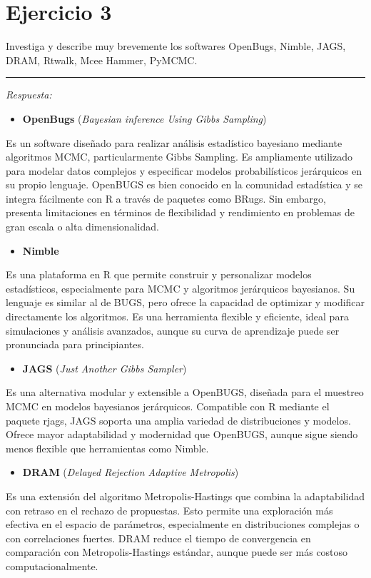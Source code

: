\newpage
\section{Ejercicio 3}
	Investiga y describe muy brevemente los softwares OpenBugs, Nimble, JAGS, DRAM, Rtwalk, Mcee Hammer, PyMCMC.

\vspace{5mm}
{\color{gray} \hrule}
\textcolor{BrickRed}{\it Respuesta:}

\begin{itemize}
	\item \textbf{OpenBugs} (\textit{Bayesian inference Using Gibbs Sampling}) 
\end{itemize}
Es un software diseñado para realizar análisis estadístico bayesiano mediante algoritmos MCMC, particularmente Gibbs Sampling. Es ampliamente utilizado para modelar datos complejos y especificar modelos probabilísticos jerárquicos en su propio lenguaje. OpenBUGS es bien conocido en la comunidad estadística y se integra fácilmente con R a través de paquetes como BRugs. Sin embargo, presenta limitaciones en términos de flexibilidad y rendimiento en problemas de gran escala o alta dimensionalidad.

\begin{itemize}
	\item \textbf{Nimble}
\end{itemize}
Es una plataforma en R que permite construir y personalizar modelos estadísticos, especialmente para MCMC y algoritmos jerárquicos bayesianos. Su lenguaje es similar al de BUGS, pero ofrece la capacidad de optimizar y modificar directamente los algoritmos. Es una herramienta flexible y eficiente, ideal para simulaciones y análisis avanzados, aunque su curva de aprendizaje puede ser pronunciada para principiantes.

\begin{itemize}
	\item \textbf{JAGS} (\textit{Just Another Gibbs Sampler})
\end{itemize}
Es una alternativa modular y extensible a OpenBUGS, diseñada para el muestreo MCMC en modelos bayesianos jerárquicos. Compatible con R mediante el paquete rjags, JAGS soporta una amplia variedad de distribuciones y modelos. Ofrece mayor adaptabilidad y modernidad que OpenBUGS, aunque sigue siendo menos flexible que herramientas como Nimble.

\begin{itemize}
	\item \textbf{DRAM} (\textit{Delayed Rejection Adaptive Metropolis})
\end{itemize}
Es una extensión del algoritmo Metropolis-Hastings que combina la adaptabilidad con retraso en el rechazo de propuestas. Esto permite una exploración más efectiva en el espacio de parámetros, especialmente en distribuciones complejas o con correlaciones fuertes. DRAM reduce el tiempo de convergencia en comparación con Metropolis-Hastings estándar, aunque puede ser más costoso computacionalmente.

